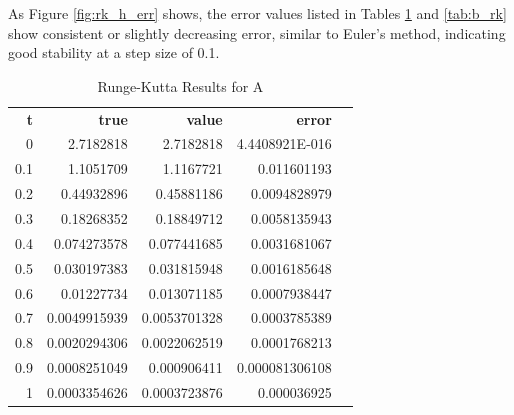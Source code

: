 \documentclass{article}
\begin{document}
As Figure \ref{fig:rk_h_err} shows, the error values listed in Tables \ref{tab:a_rk} and \ref{tab:b_rk} show consistent or slightly decreasing error, similar to Euler's method, indicating good stability at a step size of 0.1.

\begin{table}[H]
\footnotesize
\centering
\caption{Runge-Kutta Results for A}
\label{tab:a_rk}
\begin{tabular}{rrrrl}
\textbf{t} & \textbf{true} & \textbf{value} & \textbf{error} &  \\
0          & 2.7182818     & 2.7182818      & 4.4408921E-016 &  \\
0.1        & 1.1051709     & 1.1167721      & 0.011601193    &  \\
0.2        & 0.44932896    & 0.45881186     & 0.0094828979   &  \\
0.3        & 0.18268352    & 0.18849712     & 0.0058135943   &  \\
0.4        & 0.074273578   & 0.077441685    & 0.0031681067   &  \\
0.5        & 0.030197383   & 0.031815948    & 0.0016185648   &  \\
0.6        & 0.01227734    & 0.013071185    & 0.0007938447   &  \\
0.7        & 0.0049915939  & 0.0053701328   & 0.0003785389   &  \\
0.8        & 0.0020294306  & 0.0022062519   & 0.0001768213   &  \\
0.9        & 0.0008251049  & 0.000906411    & 0.000081306108 &  \\
1          & 0.0003354626  & 0.0003723876   & 0.000036925    
\end{tabular}
\end{table}
\end{document}
